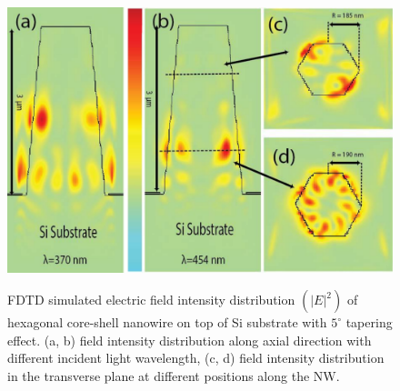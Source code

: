 \begin{figure}
  \caption{FDTD simulated electric field intensity distribution $({|E|}^2)$ of hexagonal core-shell nanowire on top of Si substrate with $5^{\circ}$ tapering effect. (a, b) field intensity distribution along axial direction with different incident light wavelength, (c, d) field intensity distribution in the transverse plane at different positions along the NW.}
  \centering
  \includegraphics[width=\textwidth]{pictures/LM/Tapering}
  \label{Tapering}
\end{figure}
